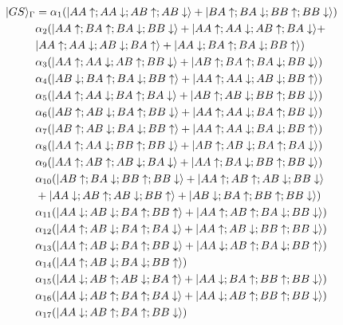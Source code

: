 \documentclass[aps,reprint,notitlepage,onecolumn,12pt]{revtex4-2}
\DeclarePairedDelimiter\ket{\lvert}{\rangle}%
\numberwithin{equation}{section}
\begin{document}
\begin{align}
\ket{GS}_{\Gamma}&=\alpha_{1}(\ket{AA\uparrow;AA\downarrow;AB\uparrow;AB\downarrow}+\ket{BA\uparrow;BA\downarrow;BB\uparrow;BB\downarrow}) \nonumber \\
&\alpha_{2}(\ket{AA\uparrow;BA\uparrow;BA\downarrow;BB\downarrow}+\ket{AA\uparrow;AA\downarrow;AB\uparrow;BA\downarrow}+\nonumber \\& \ket{AA\uparrow;AA\downarrow;AB\downarrow;BA\uparrow}+\ket{AA\downarrow;BA\uparrow;BA\downarrow;BB\uparrow}) \nonumber \\
&\alpha_{3}(\ket{AA\uparrow;AA\downarrow;AB\uparrow;BB\downarrow}+\ket{AB\uparrow;BA\uparrow;BA\downarrow;BB\downarrow}) \nonumber \\
&\alpha_{4}(\ket{AB\downarrow;BA\uparrow;BA\downarrow;BB\uparrow}+\ket{AA\uparrow;AA\downarrow;AB\downarrow;BB\uparrow}) \nonumber \\
&\alpha_{5}(\ket{AA\uparrow;AA\downarrow;BA\uparrow;BA\downarrow}+\ket{AB\uparrow;AB\downarrow;BB\uparrow;BB\downarrow}) \nonumber \\
&\alpha_{6}(\ket{AB\uparrow;AB\downarrow;BA\uparrow;BB\downarrow}+\ket{AA\uparrow;AA\downarrow;BA\uparrow;BB\downarrow}) \nonumber \\
&\alpha_{7}(\ket{AB\uparrow;AB\downarrow;BA\downarrow;BB\uparrow}+\ket{AA\uparrow;AA\downarrow;BA\downarrow;BB\uparrow}) \nonumber \\
&\alpha_{8}(\ket{AA\uparrow;AA\downarrow;BB\uparrow;BB\downarrow}+\ket{AB\uparrow;AB\downarrow;BA\uparrow;BA\downarrow}) \nonumber \\
&\alpha_{9}(\ket{AA\uparrow;AB\uparrow;AB\downarrow;BA\downarrow}+\ket{AA\uparrow;BA\downarrow;BB\uparrow;BB\downarrow}) \nonumber \\
&\alpha_{10}(\ket{AB\uparrow;BA\downarrow;BB\uparrow;BB\downarrow}+\ket{AA\uparrow;AB\uparrow;AB\downarrow;BB\downarrow}\nonumber \\&+\ket{AA\downarrow;AB\uparrow;AB\downarrow;BB\uparrow}+\ket{AB\downarrow;BA\uparrow;BB\uparrow;BB\downarrow}) \nonumber \\
&\alpha_{11}(\ket{AA\downarrow;AB\downarrow;BA\uparrow;BB\uparrow}+\ket{AA\uparrow;AB\uparrow;BA\downarrow;BB\downarrow}) \nonumber \\
&\alpha_{12}(\ket{AA\uparrow;AB\downarrow;BA\uparrow;BA\downarrow}+\ket{AA\uparrow;AB\downarrow;BB\uparrow;BB\downarrow}) \nonumber \\
&\alpha_{13}(\ket{AA\uparrow;AB\downarrow;BA\uparrow;BB\downarrow}+\ket{AA\downarrow;AB\uparrow;BA\downarrow;BB\uparrow}) \nonumber \\
&\alpha_{14}(\ket{AA\uparrow;AB\downarrow;BA\downarrow;BB\uparrow}) \nonumber \\
&\alpha_{15}(\ket{AA\downarrow;AB\uparrow;AB\downarrow;BA\uparrow}+\ket{AA\downarrow;BA\uparrow;BB\uparrow;BB\downarrow}) \nonumber \\
&\alpha_{16}(\ket{AA\downarrow;AB\uparrow;BA\uparrow;BA\downarrow}+\ket{AA\downarrow;AB\uparrow;BB\uparrow;BB\downarrow}) \nonumber \\
&\alpha_{17}(\ket{AA\downarrow;AB\uparrow;BA\uparrow;BB\downarrow}) \nonumber \\
\end{align}
\end{document}
